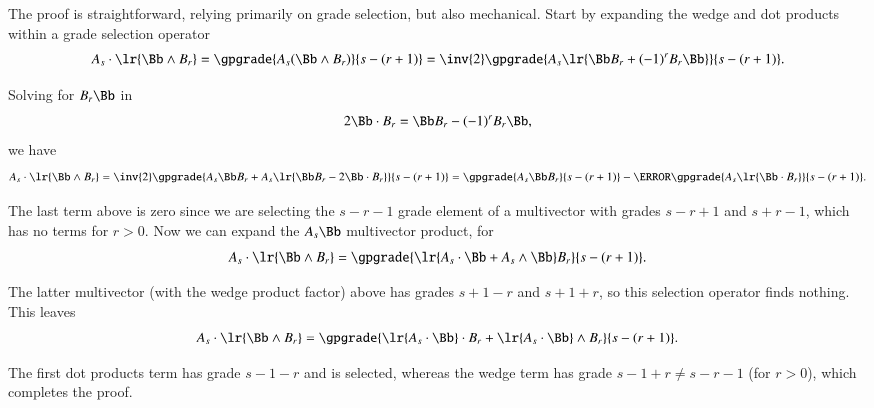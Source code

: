 %
%
The proof is straightforward, relying primarily on grade selection, but also mechanical.
Start by expanding the wedge and dot products within a grade selection operator
\begin{dmath}\label{eqn:wedgeDistributionIdentityProblemsWedgeDistributionIdentityProof:1460}
A_s \cdot \lr{ \Bb \wedge B_r }
=
\gpgrade{A_s (\Bb \wedge B_r)}{s - (r + 1)}
=
\inv{2} \gpgrade{A_s \lr{\Bb B_r + (-1)^{r} B_r \Bb} }{s - (r + 1)}.
\end{dmath}

Solving for \(B_r \Bb\) in
\begin{dmath}\label{eqn:wedgeDistributionIdentityProblemsWedgeDistributionIdentityProof:1480}
2 \Bb \cdot B_r = \Bb B_r - (-1)^{r} B_r \Bb,
\end{dmath}
we have
\begin{dmath}\label{eqn:wedgeDistributionIdentityProblemsWedgeDistributionIdentityProof:1500}
A_s \cdot \lr{ \Bb \wedge B_r }
=
\inv{2} \gpgrade{ A_s \Bb B_r + A_s \lr{ \Bb B_r - 2 \Bb \cdot B_r } }{s - (r + 1)}
=
\gpgrade{ A_s \Bb B_r }{s - (r + 1)}
-
\cancel{\gpgrade{ A_s \lr{ \Bb \cdot B_r } }{s - (r + 1)}}.
\end{dmath}

The last term above is zero since we are selecting the \(s - r - 1\) grade element of a multivector with grades \(s - r + 1\) and \(s + r - 1\), which has no terms for \(r > 0\).
Now we can expand the \(A_s \Bb\) multivector product, for
\begin{dmath}\label{eqn:wedgeDistributionIdentityProblemsWedgeDistributionIdentityProof:1520}
A_s \cdot \lr{ \Bb \wedge B_r }
=
\gpgrade{ \lr{ A_s \cdot \Bb + A_s \wedge \Bb} B_r }{s - (r + 1)}.
\end{dmath}

The latter multivector (with the wedge product factor) above has grades \(s + 1 - r\) and \(s + 1 + r\), so this selection operator finds nothing.
This leaves
\begin{dmath}\label{eqn:wedgeDistributionIdentityProblemsWedgeDistributionIdentityProof:1540}
A_s \cdot \lr{ \Bb \wedge B_r }
=
\gpgrade{
\lr{ A_s \cdot \Bb } \cdot B_r
+ \lr{ A_s \cdot \Bb } \wedge B_r
}{s - (r + 1)}.
\end{dmath}

The first dot products term has grade \(s - 1 - r\) and is selected, whereas the wedge term has grade \(s - 1 + r \ne s - r - 1\) (for \(r > 0\)), which completes the proof.

